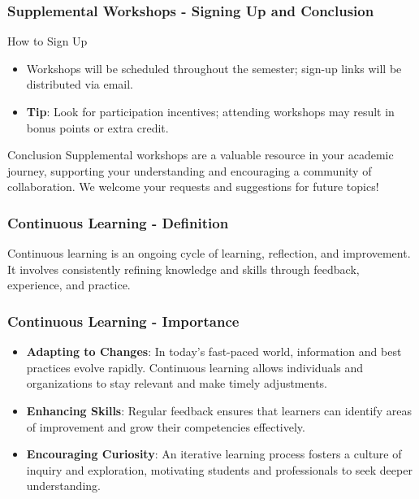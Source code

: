 \documentclass[aspectratio=169]{beamer}
\begin{document}
\begin{frame}[fragile]
  \frametitle{Supplemental Workshops - Signing Up and Conclusion}
  \begin{block}{How to Sign Up}
    \begin{itemize}
      \item Workshops will be scheduled throughout the semester; sign-up links will be distributed via email.
      \item \textbf{Tip}: Look for participation incentives; attending workshops may result in bonus points or extra credit.
    \end{itemize}
  \end{block}

  \begin{block}{Conclusion}
    Supplemental workshops are a valuable resource in your academic journey, supporting your understanding and encouraging a community of collaboration. We welcome your requests and suggestions for future topics!
  \end{block}
\end{frame}

\begin{frame}[fragile]
    \frametitle{Continuous Learning - Definition}
    Continuous learning is an ongoing cycle of learning, reflection, and improvement. 
    It involves consistently refining knowledge and skills through feedback, experience, and practice.
\end{frame}

\begin{frame}[fragile]
    \frametitle{Continuous Learning - Importance}
    \begin{itemize}
        \item \textbf{Adapting to Changes}: 
            In today’s fast-paced world, information and best practices evolve rapidly. 
            Continuous learning allows individuals and organizations to stay relevant and make timely adjustments.
            
        \item \textbf{Enhancing Skills}: 
            Regular feedback ensures that learners can identify areas of improvement and grow their competencies effectively.
            
        \item \textbf{Encouraging Curiosity}: 
            An iterative learning process fosters a culture of inquiry and exploration, 
            motivating students and professionals to seek deeper understanding.
    \end{itemize}
\end{frame}
\end{document}
